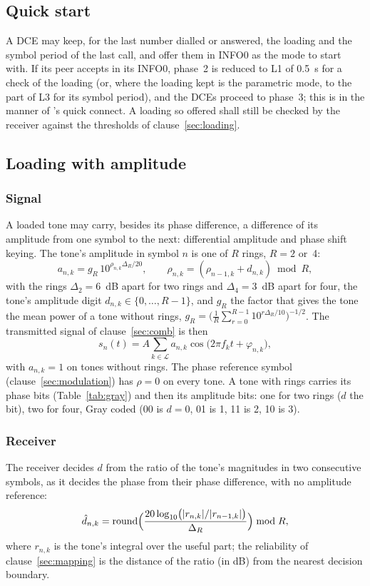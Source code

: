 \subsection{Quick start}\label{sec:quick}
A DCE may keep, for the last number dialled or answered, the loading and
the symbol period of the last call, and offer them in INFO0 as the mode
to start with.  If its peer accepts in its INFO0, phase~2 is reduced to L1 of
0.5~s for a check of the loading (or, where the loading kept is the
parametric mode, to the part of L3 for its symbol period), and the DCEs
proceed to phase~3; this
is in the manner of 's quick connect.  A loading so offered
shall still be checked by the receiver against the thresholds of
clause~\ref{sec:loading}.

\subsection{Loading with amplitude}\label{sec:qam}
\subsubsection{Signal}
A loaded tone may carry, besides its phase difference, a difference of
its amplitude from one symbol to the next: differential amplitude and
phase shift keying.  The tone's amplitude in symbol $n$ is one of $R$
rings, $R = 2$ or~4:
\[ a_{n,k} = g_R \, 10^{\rho_{n,k} \Delta_R / 20}, \qquad
   \rho_{n,k} = (\rho_{n-1,k} + d_{n,k}) \bmod R, \]
with the rings $\Delta_2 = 6$~dB apart for two rings and
$\Delta_4 = 3$~dB apart for four, the tone's amplitude digit
$d_{n,k} \in \{0, \ldots, R-1\}$, and $g_R$ the factor that gives the
tone the mean power of a tone without rings,
$g_R = \bigl(\frac{1}{R} \sum_{r=0}^{R-1} 10^{r \Delta_R / 10}\bigr)^{-1/2}$.
The transmitted signal of clause~\ref{sec:comb} is then
\[ s_n(t) = A \sum_{k \in \mathcal{L}} a_{n,k} \cos\bigl(2\pi f_k t + \varphi_{n,k}\bigr), \]
with $a_{n,k} = 1$ on tones without rings.  The phase reference symbol
(clause~\ref{sec:modulation}) has $\rho = 0$ on every tone.  A tone with
rings carries its phase bits (Table~\ref{tab:gray}) and then its
amplitude bits: one for two rings ($d$ the bit), two for four, Gray coded
(00 is $d = 0$, 01 is 1, 11 is 2, 10 is 3).

\subsubsection{Receiver}
The receiver decides $d$ from the ratio of the tone's magnitudes in two
consecutive symbols, as it decides the phase from their phase
difference, with no amplitude reference:
\[ \hat d_{n,k} = \operatorname{round}\Bigl(\frac{20 \log_{10} \bigl(|r_{n,k}| / |r_{n-1,k}|\bigr)}{\Delta_R}\Bigr) \bmod R, \]
where $r_{n,k}$ is the tone's integral over the useful part; the
reliability of clause~\ref{sec:mapping} is the distance of the ratio
(in dB) from the nearest decision boundary.

